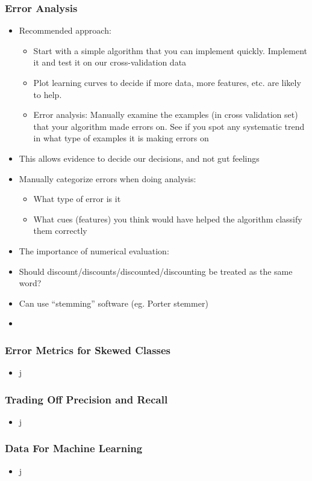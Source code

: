 \subsubsection{Error Analysis}
\begin{itemize}[--]
	\item Recommended approach:
	\begin{itemize}
		\item Start with a simple algorithm that you can implement quickly. Implement it and test it on our cross-validation data
		\item Plot learning curves to decide if more data, more features, etc. are likely to help.
		\item Error analysis: Manually examine the examples (in cross validation set) that your algorithm made errors on. See if you spot any systematic trend in what type of examples it is making errors on
	\end{itemize}

	\item This allows evidence to decide our decisions, and not gut feelings
	\item Manually categorize errors when doing analysis:
	\begin{itemize}[--]
		\item What type of error is it
		\item What cues (features) you think would have helped the algorithm classify them correctly
	\end{itemize}

	\item The importance of numerical evaluation:
	\item Should discount/discounts/discounted/discounting be treated as the same word?
	\item Can use ``stemming'' software (eg. Porter stemmer)
	\item 
\end{itemize}

\subsubsection{Error Metrics for Skewed Classes}
\begin{itemize}[--]
	\item j
\end{itemize}

\subsubsection{Trading Off Precision and Recall}
\begin{itemize}[--]
	\item j
\end{itemize}

\subsubsection{Data For Machine Learning}
\begin{itemize}[--]
	\item j
\end{itemize}
